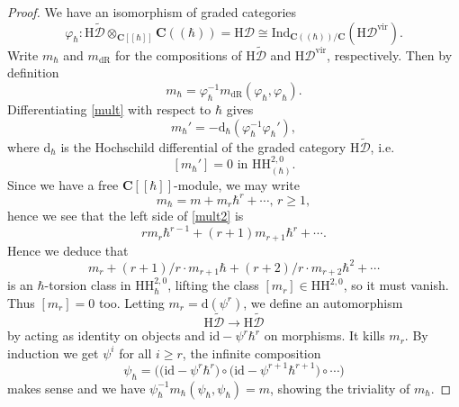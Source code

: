 \documentclass[10pt,a4paper]{amsart}
\newcommand{\C}{\mathbf C}
\newcommand{\brak}{[\![\hbar]\!]}
\newcommand{\cbrak}{(\!(\hbar)\!)}
\newcommand{\mr}{\mathrm}
\begin{document}
\begin{proof}
  We have an isomorphism of graded categories $$\varphi_{\hbar} :\mr{H}\widetilde{\mathcal{D}}\otimes_{\C\brak}\C\cbrak = \mr{H}\mathcal{D}\cong \mr{Ind}_{\C\cbrak/\C}\left(\mr{H}\mathcal{D}^{\mr{vir}}\right).$$ Write $m_{\hbar}$ and $m_{\mr{dR}}$ for the compositions of $\mr{H}\widetilde{\mathcal{D}}$ and $\mr{H}\mathcal{D}^{\mr{vir}}$, respectively. Then by definition
  \begin{equation}\label{mult}
    m_{\hbar} = \varphi_{\hbar}^{-1}m_{\mr{dR}}(\varphi_{\hbar},\varphi_{\hbar}).
  \end{equation}
 Differentiating \eqref{mult} with respect to $\hbar$ gives
 \begin{equation}\label{mult2}
 m_{\hbar}' = -\mr{d}_{\hbar}(\varphi_{\hbar}^{-1}\varphi_{\hbar}'),
 \end{equation}
 where $\mr{d}_{\hbar}$ is the Hochschild differential of the graded category $\mr{H}\widetilde{\mathcal{D}}$, i.e. $$[m_\hbar']=0\text{ in }\mr{HH}^{2,0}_{(\hbar)}.$$ Since we have a free $\C\brak$-module, we may write $$m_{\hbar} = m + m_{r}\hbar^{r} + \cdots,\, r \ge 1,$$ hence we see that the left side of \eqref{mult2} is $$rm_{r}\hbar^{r-1}+(r+1)m_{r+1}\hbar^{r} + \cdots.$$ Hence we deduce that $$m_{r}+(r+1)/r\cdot m_{r+1}\hbar + (r+2)/r\cdot m_{r+2}\hbar^{2} +\cdots$$ is an $\hbar$-torsion class in $\mr{HH}^{2,0}_\hbar$, lifting the class $[m_r] \in \mr{HH}^{2,0}$, so it must vanish. Thus $[m_r]=0$ too. Letting $m_r =\mr{d}(\psi^{r})$, we define an automorphism $$\mr{H}\widetilde{\mathcal{D}}\to \mr{H}\widetilde{\mathcal{D}}$$ by acting as identity on objects and $\mr{id}-\psi^{r}\hbar^r$ on morphisms. It kills $m_r$. By induction we get $\psi^{i}$ for all $i \ge r$, the infinite composition  $$\psi_\hbar = \big(\big(\mr{id}-\psi^{r}\hbar^r\big)\circ \big(\mr{id}-\psi^{r+1}\hbar^{r+1}\big)\circ \cdots \big)$$ makes sense and we have $\psi_\hbar^{-1}m_\hbar(\psi_\hbar,\psi_\hbar) = m$, showing the triviality of $m_\hbar$.
\end{proof}
\end{document}
